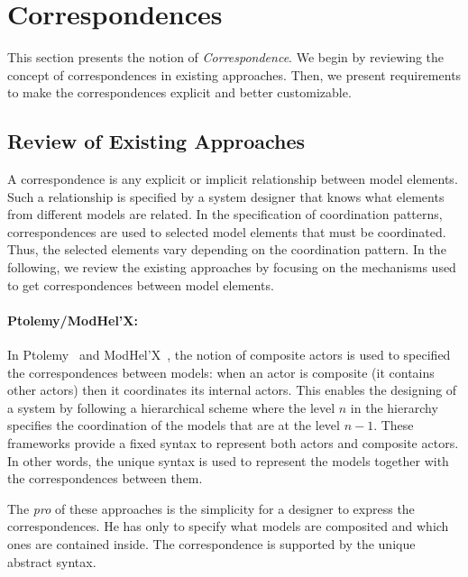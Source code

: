 \section{Correspondences}
This section presents the notion of \emph{Correspondence}. We begin by reviewing the concept of correspondences in existing approaches. Then, we present requirements to make the correspondences explicit and better customizable.  

\subsection{Review of Existing Approaches}
A correspondence is any explicit or implicit relationship between model elements. Such a relationship is specified by a system designer that knows what elements from different models are related. In the specification of coordination patterns, correspondences are used to selected model elements that must be coordinated. Thus, the selected elements vary depending on the coordination pattern. In the following, we review the existing approaches by focusing on the mechanisms used to get correspondences between model elements.      

\paragraph{Ptolemy/ModHel'X: }
In Ptolemy~\cite{ptoleframebib} and ModHel'X~\cite{modhelxbib}, the notion of composite actors is used to specified the correspondences between models: when an actor is composite (\ie it contains other actors) then it coordinates its internal actors. This enables the designing of a system by following a hierarchical scheme where the level $n$ in the hierarchy specifies the coordination of the models that are at the level $n-1$. These frameworks provide a fixed syntax to represent both actors and composite actors. In other words, the unique syntax is used to represent the models together with the correspondences between them. 

The \emph{pro} of these approaches is the simplicity for a designer to express the correspondences. He has only to specify what models are composited and which ones are contained inside. The correspondence is supported by the unique abstract syntax. 

